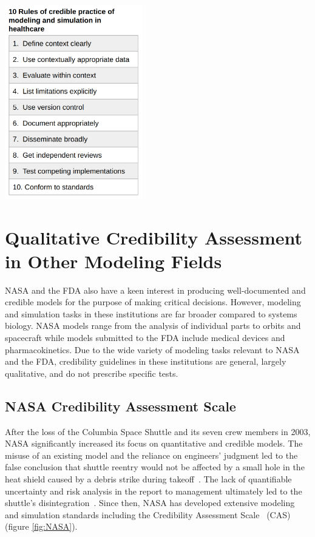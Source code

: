 \documentclass[12pt]{report}
\begin{document}
\begin{center}
    \captionsetup{type=figure}
    \includegraphics[width=6cm]{images/10rules.png}
    \label{fig:10rules}
\end{center}


\section{Qualitative Credibility Assessment in Other Modeling Fields}
NASA and the FDA also have a keen interest in producing well-documented and credible models for the purpose of making critical decisions. However, modeling and simulation tasks in these institutions are far broader compared to systems biology. NASA models range from the analysis of individual parts to orbits and spacecraft while models submitted to the FDA include medical devices and pharmacokinetics. Due to the wide variety of modeling tasks relevant to NASA and the FDA, credibility guidelines in these institutions are general, largely qualitative, and do not prescribe specific tests.


\subsection{NASA Credibility Assessment Scale}

After the loss of the Columbia Space Shuttle and its seven crew members in 2003, NASA significantly increased its focus on quantitative and credible models. The misuse of an existing model and the reliance on engineers' judgment led to the false conclusion that shuttle reentry would not be affected by a small hole in the heat shield caused by a debris strike during takeoff~\cite{Blattnig2013-qx, Howell2021}. The lack of quantifiable uncertainty and risk analysis in the report to management ultimately led to the shuttle's disintegration~\cite{Niewoehner2008}. Since then, NASA has developed extensive modeling and simulation standards including the Credibility Assessment Scale~\cite{babula_nasa_2009} (CAS) (figure \ref{fig:NASA}).  
\end{document}
